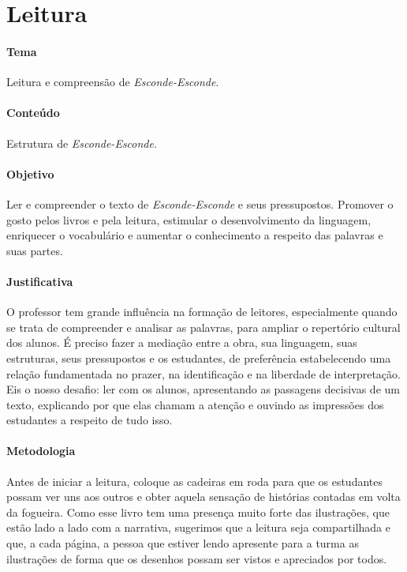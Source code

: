 \documentclass[11pt]{extarticle}
\begin{document}
\section{Leitura}


\paragraph{Tema} Leitura e compreensão de \textit{Esconde-Esconde}.

\paragraph{Conteúdo} Estrutura de \textit{Esconde-Esconde}.  

\paragraph{Objetivo} Ler e compreender o texto de \textit{Esconde-Esconde} e seus pressupostos. Promover o gosto pelos livros e pela leitura, estimular o desenvolvimento da linguagem, enriquecer o vocabulário e aumentar o conhecimento a respeito das palavras e suas partes.   

\paragraph{Justificativa} O professor tem grande influência na formação de leitores, especialmente quando se trata de compreender e analisar as palavras, para ampliar o repertório cultural dos alunos. É preciso fazer a mediação entre a obra, sua linguagem, suas estruturas, seus pressupostos e os estudantes, de preferência estabelecendo uma relação fundamentada no prazer, na identificação e na liberdade de interpretação. Eis o nosso desafio: ler com os alunos, apresentando as passagens decisivas de um texto, explicando por que elas chamam a atenção e  ouvindo as impressões dos estudantes a respeito de tudo isso.  

\paragraph{Metodologia} Antes de iniciar a leitura, coloque as cadeiras em roda para que os estudantes possam ver uns aos outros e obter aquela sensação de histórias contadas em volta da fogueira. Como esse livro tem uma presença muito forte das ilustrações, que estão lado a lado com a narrativa, sugerimos que a leitura seja compartilhada e que, a cada página, a pessoa que estiver lendo apresente para a turma as ilustrações de forma que os desenhos possam ser vistos e apreciados por todos. 
\end{document}

